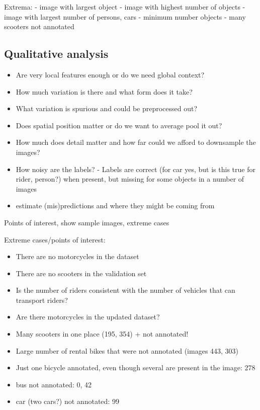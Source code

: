 \documentclass{article}
\begin{document}
Extrema:
- image with largest object
- image with highest number of objects
- image with largest number of persons, cars
- minimum number objects - many scooters not annotated

\subsection*{Qualitative analysis}
\begin{itemize}
    \item Are very local features enough or do we need global context? \cite{Karpathy2019}
    \item How much variation is there and what form does it take? 
    \item What variation is spurious and could be preprocessed out? 
    \item Does spatial position matter or do we want to average pool it out? 
    \item How much does detail matter and how far could we afford to downsample the images?
    \item How noisy are the labels? - Labels are correct (for car yes, but is this true for rider, person?) when present, but missing for some objects in a number of images
    \item estimate (mis)predictions and where they might be coming from
\end{itemize}

Points of interest, show sample images, extreme cases

Extreme cases/points of interest:
\begin{itemize}
    \item There are no motorcycles in the dataset
    \item There are no scooters in the validation set
    \item Is the number of riders consistent with the number of vehicles that can transport riders?
    \item Are there motorcycles in the updated dataset?
    \item Many scooters in one place (195, 354) + not annotated!
    \item Large number of rental bikes that were not annotated (images 443, 303)
    \item Just one bicycle annotated, even though several are present in the image: 278
    \item bus not annotated: 0, 42
    \item car (two cars?) not annotated: 99

\end{itemize}
\end{document}
